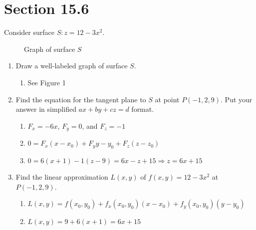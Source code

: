 \documentclass[letter,11pt]{article}
\begin{document}
\section*{Section 15.6}
Consider surface $S:z = 12 -3x^2$.
\begin{figure}[h]
	\centering
        \caption{Graph of surface $S$}
        \end{figure}
\begin{enumerate}[label = \Alph*.]
    \item Draw a well-labeled graph of surface $S$.
    \begin{enumerate}[label=\roman*.]
        \item See Figure 1
    \end{enumerate}
    \item Find the equation for the tangent plane to $S$ at point $P (-1, 2, 9)$. Put your answer in simplified $ax + by + cz = d$ format.
    \begin{enumerate}[label=\roman*.]
        \item $F_{x} = -6x$, $F_{y} = 0$, and $F_{z}=-1$
        \item $0=F_{x}(x-x_0)+F_{y}{y-y_0}+F_{z}(z-z_0)$
        \item $0=6(x+1)-1(z-9) = 6x-z+15 \Longrightarrow z = 6x+15$
    \end{enumerate}
    \item Find the linear approximation $L(x, y)$ of $f (x, y) = 12-3x^2$ at $P (-1, 2, 9)$.
    \begin{enumerate}[label=\roman*.]
        \item $L(x,y) = f(x_{0}, y_{0}) + f_{x}(x_0,y_0) (x-x_0)+f_{y}(x_0,y_0)(y-y_0)$
        \item $L(x,y) = 9 + 6(x+1) = 6x+15$
    \end{enumerate}
\end{enumerate}
\end{document}
